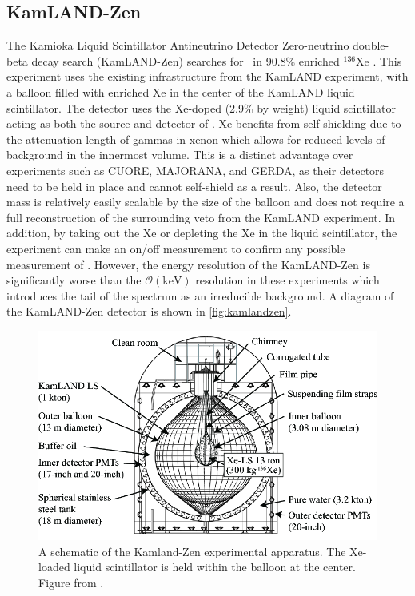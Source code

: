 \subsection{KamLAND-Zen}
The Kamioka Liquid Scintillator Antineutrino Detector Zero-neutrino double-beta decay search (KamLAND-Zen) searches for \zeronubb~in 90.8\% enriched $^{136}$Xe \cite{KamLAND-Zen:2016pfg}.
This experiment uses the existing infrastructure from the KamLAND experiment, with a balloon filled with enriched Xe in the center of the KamLAND liquid scintillator.
The detector uses the Xe-doped (2.9\% by weight) liquid scintillator acting as both the source and detector of \zeronubb.
Xe benefits from self-shielding due to the attenuation length of gammas in xenon which allows for reduced levels of background in the innermost volume.
This is a distinct advantage over experiments such as CUORE, MAJORANA, and GERDA, as their detectors need to be held in place and cannot self-shield as a result.
Also, the detector mass is relatively easily scalable by the size of the balloon and does not require a full reconstruction of the surrounding veto from the KamLAND experiment.
In addition, by taking out the Xe or depleting the Xe in the liquid scintillator, the experiment can make an on/off measurement to confirm any possible measurement of \zeronubb. 
However, the energy resolution of the KamLAND-Zen is significantly worse than the $\mathcal{O}(\textrm{keV})$ resolution in these experiments which introduces the tail of the \twonubb spectrum as an irreducible background.
A diagram of the KamLAND-Zen detector is shown in \autoref{fig:kamlandzen}.
\begin{figure}[tbph]
\centering
\includegraphics[width=0.7\linewidth]{Figures/KamlandZen}
\caption[A schematic of the Kamland-Zen experimental apparatus.]
{A schematic of the Kamland-Zen experimental apparatus.
The Xe-loaded liquid scintillator is held within the balloon at the center.
Figure from \cite{::2015uaa}.}
\label{fig:kamlandzen}
\end{figure}

